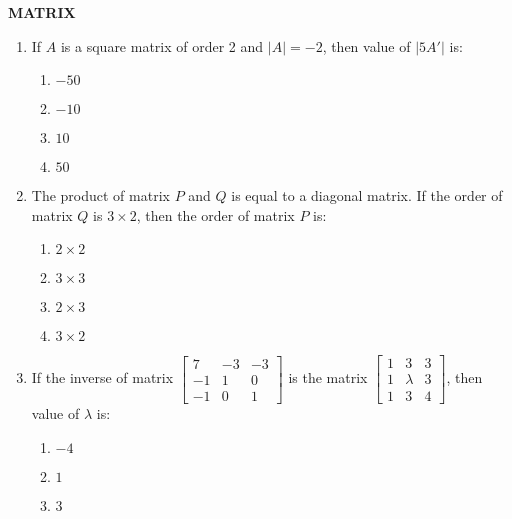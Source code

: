 \documentclass[12pt,-letter paper]{article}
\providecommand{\myvec}[1]{\ensuremath{\begin{bmatrix}#1\end{bmatrix}}}
\providecommand{\brak}[1]{\ensuremath{\left(#1\right)}}
\begin{document}
\begin{center}                                                              \textbf{MATRIX}                                                     \end{center}  
\begin{enumerate}
	\item If $A$ is a square matrix of order 2 and $|A| = -2$, then  value of $|5A'|$ is:                                                            \begin{enumerate}[label={$\brak{\Alph*}$}]
        \item $-50$
        \item $-10$                                                             \item $10$                                                              \item $50$                                                          \end{enumerate}                                                                                                                                 \item The product of matrix $P$ and $Q$ is equal to a diagonal matrix. If the order of matrix $Q$ is $ 3 \times 2 $, then the order of matrix $P$ is:                                                                   \begin{enumerate}[label={$\brak{\Alph*}$}]                                  \item $2 \times 2$                                                      \item $3 \times 3$                                                      \item $2 \times 3$                                                      \item $3 \times 2$                                                          \end{enumerate}                                                                                                                        \item If the inverse of  matrix $\myvec{7 & -3 & -3 \\ -1 & 1 & 0 \\ -1 & 0 & 1}$ is the matrix $\myvec{1 & 3 & 3 \\ 1 & \lambda & 3 \\ 1 & 3 & 4}$, then value of $\lambda$ is:
     \begin{enumerate}[label={$\brak{\Alph*}$}]                               \item $-4$                                                              \item $1$                                                               \item $3$

\end{enumerate}
\end{enumerate}
\end{document}

